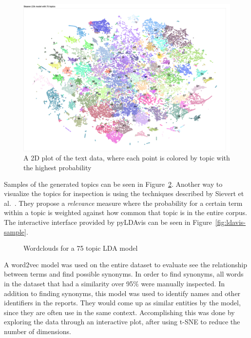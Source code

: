\begin{figure}
    \centering
    \includegraphics[scale=0.25]{figures/lda-2d-distribution.png}
    \caption{A 2D plot of the text data, where each point is colored by topic with the highest probability}
    \label{fig:lda-dist}
\end{figure}

Samples of the generated topics can be seen in Figure~\ref{fig:topic-wordclouds}.
Another way to visualize the topics for inspection is using the techniques described by Sievert et al\@.~\cite{sievert2014ldavis}.
They propose a \textit{relevance} measure where the probability for a certain term within a topic is weighted against how common that topic is in the entire corpus.
The interactive interface provided by pyLDAvis can be seen in Figure~\ref{fig:ldavis-sample}.

\begin{figure}
    \centering
    \caption{Wordclouds for a 75 topic LDA model}
    \label{fig:topic-wordclouds}
\end{figure}

A word2vec model was used on the entire dataset to evaluate see the relationship between terms and find possible synonyms.
In order to find synonyms, all words in the dataset that had a similarity over 95\% were manually inspected.
In addition to finding synonyms, this model was used to identify names and other identifiers in the reports.
They would come up as similar entities by the model, since they are often use in the same context.
Accomplishing this was done by exploring the data through an interactive plot, after using t-SNE to reduce the number of dimensions.

